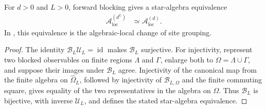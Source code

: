 \begin{definition}
    \label{def:qca_algebraic_blocking}
    \leanok
    For $d>0$ and $L>0$, forward blocking gives a star-algebra equivalence
    \begin{align}
        \mathcal A_{\mathrm{loc}}^{(d^L)}
         & \simeq \mathcal A_{\mathrm{loc}}^{(d)}.
    \end{align}
    In \cite[lines~2308 and 2313--2320]{Cirac2017MPU}, this equivalence is the algebraic-local change of site
    grouping.
\end{definition}

\begin{proof}\leanok
    The identity $\mathcal B_L\mathcal U_L=\operatorname{id}$ makes
    $\mathcal B_L$ surjective.  For injectivity, represent two blocked
    observables on finite regions $\Lambda$ and $\Gamma$, enlarge both to
    $\Omega=\Lambda\cup\Gamma$, and suppose their images under
    $\mathcal B_L$ agree.  Injectivity of the canonical map from the finite
    algebra on $\widehat\Omega_L$, followed by injectivity of
    $\mathcal B_{L,\Omega}$ and the finite commuting square, gives equality of
    the two representatives in the algebra on $\Omega$.  Thus
    $\mathcal B_L$ is bijective, with inverse $\mathcal U_L$, and defines the
    stated star-algebra equivalence.
\end{proof}


